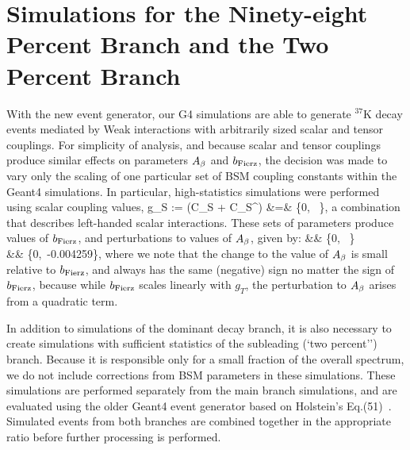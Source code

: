 \section{Simulations for the Ninety-eight Percent Branch and the Two Percent Branch}
\label{sec:TwoP}
With the new event generator, our G4 simulations are able to generate $^{37}$K decay events mediated by Weak interactions with arbitrarily sized scalar and tensor couplings.  For simplicity of analysis, and because scalar and tensor couplings produce similar effects on parameters $A_{\beta}$ and $b_{\mathrm{Fierz}}$, the decision was made to vary only the scaling of one particular set of BSM coupling constants within the Geant4 simulations. In particular, high-statistics simulations were performed using scalar coupling values,
\bea
g_S := (C_S + C_S^\prime) &=& \{0, \, \}, 
\eea
a combination that describes left-handed scalar interactions.  These sets of parameters produce values of
$b_{\mathrm{Fierz}}$, and perturbations to values of $A_{\beta}$, given by:
\bea
\bFierz &\approx& \{0, \, \}  \\
\Delta \Abeta &\approx& \{0,\, -0.004259\}, 
\eea
where we note that the change to the value of $A_{\beta}$ is small relative to $b_{\mathrm{Fierz}}$, and always has the same (negative) sign no matter the sign of $b_{\mathrm{Fierz}}$, because while $b_{\mathrm{Fierz}}$ scales linearly with $g_T$, the perturbation to $A_{\beta}$ arises from a quadratic term.

In addition to simulations of the dominant decay branch, it is also necessary to create simulations with sufficient statistics of the subleading (`two percent'') branch.  Because it is responsible only for a small fraction of the overall spectrum, we do not include corrections from BSM parameters in these simulations.  These simulations are performed separately from the main branch simulations, and are evaluated using the older Geant4 event generator based on Holstein's Eq.(51)~\cite{holstein}.  Simulated events from both branches are combined together in the appropriate ratio before further processing is performed.

